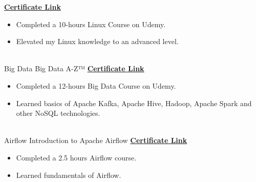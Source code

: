 \documentclass[letterpaper]{DS_class_file} %
\begin{document}
\begin{twenty}
	{\href{https://www.udemy.com/certificate/UC-74719d94-89af-44ba-ab2d-4299dd2ec3dd/}{\textbf{Certificate Link}}}
	{}
	{
		{\begin{itemize}
				\item Completed a 10-hours Linux Course on Udemy.
				\item Elevated my Linux knowledge to an advanced level.
		\end{itemize}}
	}
	\\
	\twentyitem
	{Big Data}
	{}
	{\hspace{0.3cm}Big Data A-Z™}
	{\href{https://www.udemy.com/certificate/UC-4a851250-cc99-4a9d-8f7c-d8a32ed0a832/}{\textbf{Certificate Link}}}
	{}
	{
		{\begin{itemize}
				\item Completed a 12-hours Big Data Course on Udemy.
				\item Learned basics of Apache Kafka, Apache Hive, Hadoop, Apache Spark and other NoSQL technologies.
		\end{itemize}}
	}
	\\
	\twentyitem
	{Airflow}
	{}
	{\hspace{0.3cm}Introduction to Apache Airflow}
	{\href{https://www.udemy.com/certificate/UC-634f3164-fcb1-4bdf-b5b0-909134dd3252/}{\textbf{Certificate Link}}}
	{}
	{
		{\begin{itemize}
				\item Completed a 2.5 hours Airflow course.
                    \item Learned fundamentals of Airflow.
		\end{itemize}}
	}
	

	
\end{twenty}



	
\end{document}
